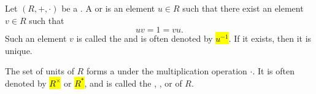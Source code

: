 \begin{definition} \label{definition:unit_of_a_ring_invertible_element_of_a_ring_unit_group_of_a_group}
    Let $(R,+,\cdot)$ be a . A  or  is an element $u \in R$ such that there exist an element $v \in R$ such that 
    $$uv = 1 = vu.$$ 
    Such an element $v$ is called the  and is often denoted by \hl{$u^{-1}$}. If it exists, then it is unique.
    
    The set of units of $R$ forms a  under the multiplication operation $\cdot$. It is often denoted by \hl{$R^\times$} or \hl{$R^*$}, and is called the , , or  of $R$.
\end{definition}
